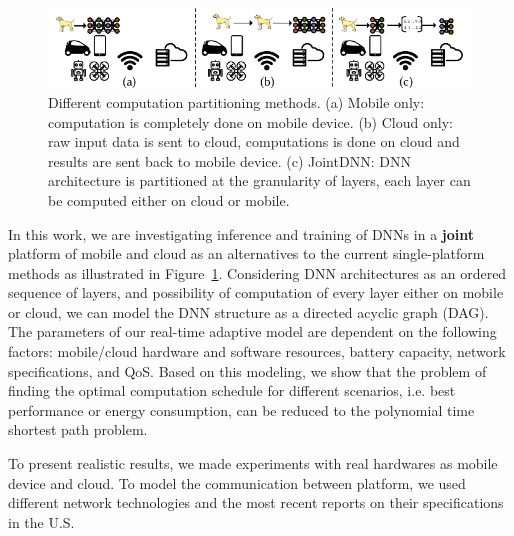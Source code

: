 \begin{figure}[h]
\centering
\includegraphics[width=\linewidth]{overall_system}
\caption{Different computation partitioning methods. (a) Mobile only: computation is completely done on mobile device. (b) Cloud only: raw input data is sent to cloud, computations is done on cloud and results are sent back to mobile device. (c) JointDNN: DNN architecture is partitioned at the granularity of layers, each layer can be computed either on cloud or mobile.}
\label{fig:fig_intro}
\end{figure}

In this work, we are investigating inference and training of DNNs in a \textbf{joint} platform of mobile and cloud as an alternatives to the current single-platform methods as illustrated in Figure~\ref{fig:fig_intro}. Considering DNN architectures as an ordered sequence of layers, and possibility of computation of every layer either on mobile or cloud, we can model the DNN structure as a directed acyclic graph (DAG). The parameters of our real-time adaptive model are dependent on the following factors: mobile/cloud hardware and software resources, battery capacity, network specifications, and QoS. Based on this modeling, we show that the problem of finding the optimal computation schedule for different scenarios, i.e. best performance or energy consumption, can be reduced to the polynomial time shortest path problem. 

To present realistic results, we made experiments with real hardwares as mobile device and cloud. To model the communication between platform, we used different network technologies and the most recent reports on their specifications in the U.S. 

